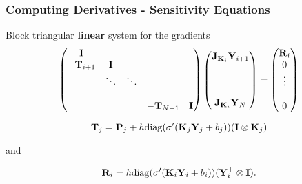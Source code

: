 \documentclass[12pt,fleqn,handout]{beamer}
\begin{document}
\begin{frame}[fragile]\frametitle{Computing Derivatives - Sensitivity Equations}

Block triangular {\bf linear} system for the gradients
{\small
\begin{eqnarray*}
\begin{pmatrix}
{\bf I}              &                &                &          &       \\
-{\bf T}_{i+1}    &   {\bf I}       &                &          &       \\
                    & \ddots    &  \ddots    &          &      \\
                    &     &      &          &      \\
                    &     &        &   -{\bf T}_{N-1}       & {\bf I}
                    \end{pmatrix}
                    \begin{pmatrix}
                    {\bf J}_{{\bf K}_i}{\bf Y}_{i+1} \\    \\   \\ \\   {\bf J}_{{\bf K}_i}{\bf Y}_{N}
                    \end{pmatrix} =
                    \begin{pmatrix}
                    {\bf R}_i \\  0\\  \vdots \\ \\   0
                    \end{pmatrix}
\end{eqnarray*}}


$${\bf T}_j = {\bf P}_j + h {\rm diag}(\sigma'( {\bf K}_j {\bf Y}_j+ b_j))
({\bf I} \otimes {\bf K}_j) $$

and 

$$ {\bf R}_i = h {\rm diag}(\sigma'({\bf K}_i {\bf Y}_i  + b_i)) ( {\bf Y}_i^\top \otimes {\bf I}). $$


\end{frame}
\end{document}
